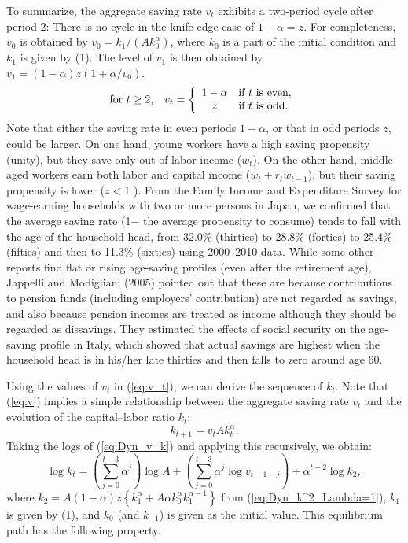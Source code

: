 \documentclass[nogrid]{MBE}%
\begin{document}
{To summarize, the aggregate saving rate $v_{t}$ exhibits a two-period cycle after period 2: {There
is no cycle in the knife-edge case of $1-\alpha=z$. For completeness, $v_{0}$ is obtained by
$v_{0}= k_{1}/\left( Ak_{0}^{\alpha}\right)  $, where $k_{0}$ is a part of the initial condition
and $k_{1}$ is given by (1). The level of $v_{1}$ is
then obtained by $v_{1}=\left(  1-\alpha\right)  z \left(  1+{\alpha}/{v_{0}%
}\right)  .$ \label{foot:v}}
\begin{equation}
\text{for $t\geq2$,}\quad v_{t}=\left\{
\begin{array}
[c]{cl}%
1-\alpha & \text{if $t$ is even},\\
z & \text{if $t$ is odd}.
\end{array}
\right.  \label{eq:v_t}%
\end{equation}
Note that either the saving rate in even periods $1-\alpha$, or that in odd
periods $z$, could be larger. On one hand, young workers have a high saving
propensity (unity), but they save only out of labor income ($w_{t}$). On the
other hand, middle-aged workers earn both labor and capital income
($w_{t}+r_{t}w_{t-1}$), but their saving propensity is lower ($z<1$%
). {From the Family Income and Expenditure Survey for wage-earning households with two or more
persons in Japan, we confirmed that the average saving rate (1$-$ the average propensity to
consume) tends to fall with the age of the household head, from 32.0\% (thirties) to 28.8\%
(forties) to 25.4\% (fifties) and then to 11.3\% (sixties) using 2000--2010 data. While some other
reports find flat or rising age-saving profiles (even after the retirement age), Jappelli and
Modigliani (2005) pointed out that these are because contributions to pension funds (including
employers' contribution) are not regarded as savings, and also because pension incomes are treated
as income although they should be regarded as dissavings. They estimated the effects of social
security on the age-saving profile in Italy, which showed that actual savings are highest when the
household head is in his/her late thirties and then falls to zero around age 60.}

Using the values of $v_{t}$ in (\ref{eq:v_t}), we can derive the sequence of
$k_{t}$. Note that (\ref{eq:v}) implies a simple relationship between the
aggregate saving rate $v_{t}$ and the evolution of the capital--labor ratio
$k_{t}$:
\begin{equation}
k_{t+1}=v_{t}Ak_{t}^{\alpha}. \label{eq:Dyn_v_k}%
\end{equation}
Taking the logs of (\ref{eq:Dyn_v_k}) and applying this recursively, we
obtain:
\begin{equation}
\log k_{t}=\left(  \sum_{j=0}^{t-3}\alpha^{j}\right)  \log A+\left(
\sum_{j=0}^{t-3}\alpha^{j}\log v_{t-1-j}\right)  +\alpha^{t-2}\log k_{2}, \label{eq:ksequence}%
\end{equation}
where $k_{2}=A(1-\alpha)z\left\{  k_{1}^{\alpha}+A\alpha k_{0}^{\alpha}%
k_{1}^{\alpha-1}\right\}  $ from (\ref{eq:Dyn_k^2_Lambda=1}), $k_{1}$ is given by (1), and $k_{0}$
(and $k_{-1}$) is given as the initial value. This equilibrium path has the following property.

}
\end{document}
